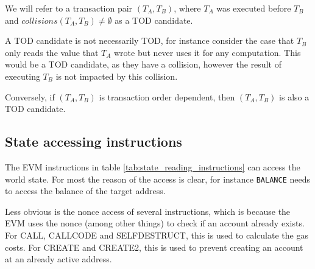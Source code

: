 \documentclass[draft,final]{vutinfth} %
\begin{document}
We will refer to a transaction pair $(T_A, T_B)$, where $T_A$ was executed before $T_B$ and $collisions(T_A, T_B) \neq \emptyset$ as a TOD candidate.

A TOD candidate is not necessarily TOD, for instance consider the case that $T_B$ only reads the value that $T_A$ wrote but never uses it for any computation. This would be a TOD candidate, as they have a collision, however the result of executing $T_B$ is not impacted by this collision.

Conversely, if $(T_A, T_B)$ is transaction order dependent, then $(T_A, T_B)$ is also a TOD candidate.

\subsection{State accessing instructions}

The EVM instructions in table \ref{tab:state_reading_instructions} can access the world state. For most the reason of the access is clear, for instance \verb|BALANCE| needs to access the balance of the target address.

Less obvious is the nonce access of several instructions, which is because the EVM uses the nonce (among other things) to check if an account already exists. For CALL, CALLCODE and SELFDESTRUCT, this is used to calculate the gas costs. For CREATE and CREATE2, this is used to prevent creating an account at an already active address. \cite{wood_ethereum_2024}
\end{document}
